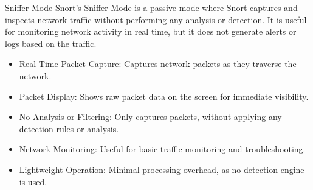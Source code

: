 \begin{frame}[t]{Sniffer Mode}
  \fontsize{11.5}{14}\selectfont
  \vspace{0.1cm}
  Snort's Sniffer Mode is a passive mode where Snort captures and inspects network traffic without performing any analysis or detection. It is useful for monitoring network activity in real time, but it does not generate alerts or logs based on the traffic.
  \vspace{0.12cm}
  \begin{itemize}
    \item \textcolor{WarningColor}{Real-Time Packet Capture:} Captures network packets as they traverse the network.
    \item \textcolor{WarningColor}{Packet Display:} Shows raw packet data on the screen for immediate visibility.
    \item \textcolor{WarningColor}{No Analysis or Filtering:} Only captures packets, without applying any detection rules or analysis.
    \item \textcolor{WarningColor}{Network Monitoring:} Useful for basic traffic monitoring and troubleshooting.
    \item \textcolor{WarningColor}{Lightweight Operation:} Minimal processing overhead, as no detection engine is used.
  \end{itemize}
\end{frame}
